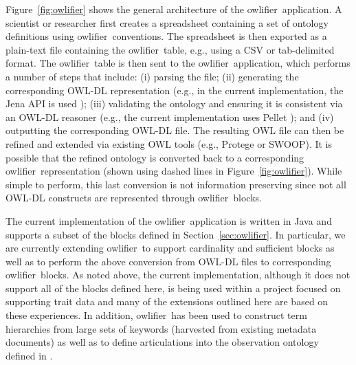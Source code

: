 \documentclass[preprint,number]{elsarticle}
\newcommand{\owlifier}{\textsf{owlifier}}
\newcommand{\secref}[1]{Section~\ref{#1}}
\newcommand{\figref}[1]{Figure~\ref{#1}}
\begin{document}
\figref{fig:owlifier} shows the general architecture of the \owlifier\
application. A scientist or researcher first creates a spreadsheet
containing a set of ontology definitions using \owlifier\ conventions.
The spreadsheet is then exported as a plain-text file containing the
\owlifier\ table, e.g., using a CSV or tab-delimited format. The
\owlifier\ table is then sent to the \owlifier\ application, which
performs a number of steps that include: (i) parsing the file; (ii)
generating the corresponding OWL-DL representation (e.g., in the
current implementation, the Jena API is used \cite{carroll04:_jena});
(iii) validating the ontology and ensuring it is consistent via an
OWL-DL reasoner (e.g., the current implementation uses Pellet
\cite{sirin07:_pellet}); and (iv) outputting the corresponding OWL-DL
file. The resulting OWL file can then be refined and extended via
existing OWL tools (e.g., Protege or SWOOP). It is possible that the
refined ontology is converted back to a corresponding \owlifier\
representation (shown using dashed lines in
\figref{fig:owlifier}). While simple to perform, this last conversion
is not information preserving since not all OWL-DL constructs are
represented through \owlifier\ blocks.

The current implementation of the \owlifier\ application is written in
Java and supports a subset of the blocks defined in
\secref{sec:owlifier}. In particular, we are currently extending
\owlifier\ to support cardinality and sufficient blocks as well as to
perform the above conversion from OWL-DL files to corresponding
\owlifier\ blocks. As noted above, the current implementation,
although it does not support all of the blocks defined here, is being
used within a project focused on supporting trait data and many of the
extensions outlined here are based on these experiences. In addition,
\owlifier\ has been used to construct term hierarchies from large sets
of keywords (harvested from existing metadata documents) as well as to
define articulations into the observation ontology defined in
\cite{madin07:_ontol_for_descr_and_synth}. 
\end{document}
